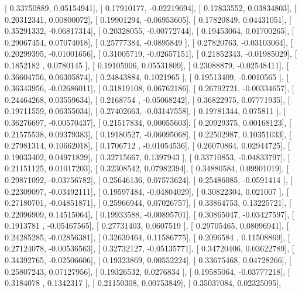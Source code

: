 \documentclass{article}
\begin{document}
       [ 0.33750889,  0.05154941],
       [ 0.17910177, -0.02219694],
       [ 0.17833552,  0.03834803],
       [ 0.20312341,  0.00800072],
       [ 0.19901294, -0.06953605],
       [ 0.17820849,  0.04431051],
       [ 0.35291332, -0.06817314],
       [ 0.20328055, -0.00772744],
       [ 0.19453064,  0.01700265],
       [ 0.29067454,  0.07074018],
       [ 0.25777384, -0.0895849 ],
       [ 0.27820763, -0.03103064],
       [ 0.20299395, -0.01001656],
       [ 0.31005719, -0.02657151],
       [ 0.21852343, -0.01985029],
       [ 0.1852182 ,  0.0780145 ],
       [ 0.19105906,  0.05531809],
       [ 0.23088879, -0.02548411],
       [ 0.36604756,  0.06305874],
       [ 0.24843884,  0.1021965 ],
       [ 0.19513409, -0.0010565 ],
       [ 0.36343956, -0.02686011],
       [ 0.31819108,  0.06762186],
       [ 0.26792721, -0.00334657],
       [ 0.24464268,  0.03559634],
       [ 0.2168754 , -0.05068242],
       [ 0.36822975,  0.07771935],
       [ 0.19711559,  0.06355034],
       [ 0.27402663, -0.03147558],
       [ 0.19781344,  0.075811  ],
       [ 0.36276697, -0.00570437],
       [ 0.21517834,  0.00055603],
       [ 0.20929375,  0.00168123],
       [ 0.21575538,  0.09379383],
       [ 0.19180527, -0.06095068],
       [ 0.22502987,  0.10351033],
       [ 0.27981314,  0.10662018],
       [ 0.1706712 , -0.01054536],
       [ 0.26070864,  0.02944725],
       [ 0.19033402,  0.04971829],
       [ 0.32715667,  0.1397943 ],
       [ 0.33710853, -0.04833797],
       [ 0.21151125,  0.01017203],
       [ 0.32308542,  0.07982394],
       [ 0.34880584,  0.09901019],
       [ 0.29871092, -0.03756782],
       [ 0.25646136,  0.07573624],
       [ 0.25486085, -0.0591414 ],
       [ 0.22309097, -0.03492111],
       [ 0.19597484, -0.04804029],
       [ 0.30822304,  0.021007  ],
       [ 0.27180701, -0.04851871],
       [ 0.25966944,  0.07026757],
       [ 0.33864753,  0.13225721],
       [ 0.22096909,  0.14515064],
       [ 0.19933588, -0.00895701],
       [ 0.30865047, -0.03427597],
       [ 0.1913781 , -0.05467565],
       [ 0.27731403,  0.0607519 ],
       [ 0.29705465,  0.08096941],
       [ 0.24285285, -0.02856381],
       [ 0.32639464,  0.11586775],
       [ 0.2096584 ,  0.11508869],
       [ 0.27124078, -0.00536563],
       [ 0.32732127, -0.05135771],
       [ 0.34720406,  0.03622789],
       [ 0.34392765, -0.02506606],
       [ 0.19323869,  0.00552224],
       [ 0.33675468,  0.04728266],
       [ 0.25807243,  0.07127956],
       [ 0.19326532,  0.0276834 ],
       [ 0.19585064, -0.03777218],
       [ 0.3184078 ,  0.1342317 ],
       [ 0.21150308,  0.00753849],
       [ 0.35037084,  0.02325095],
\end{document}
